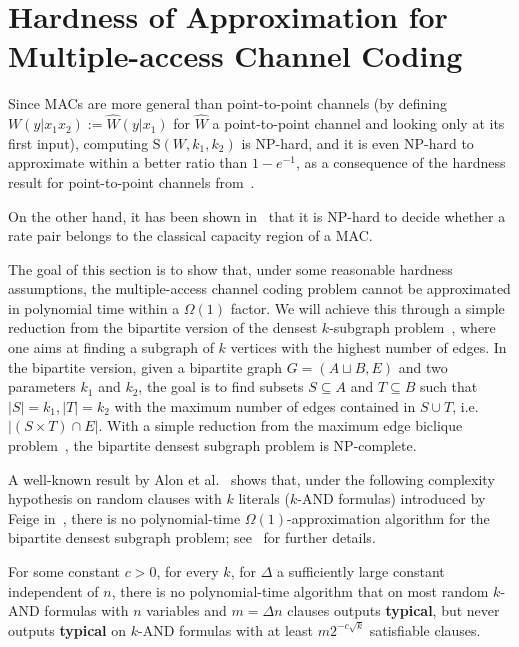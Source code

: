 \section{Hardness of Approximation for Multiple-access Channel Coding}
\label{section:hardness}
Since MACs are more general than point-to-point channels (by defining $W(y|x_1x_2):=\hat{W}(y|x_1)$ for $\hat{W}$ a point-to-point channel and looking only at its first input), computing $\mathrm{S}(W,k_1,k_2)$ is \textrm{NP}-hard, and it is even \textrm{NP}-hard to approximate within a better ratio than $1-e^{-1}$, as a consequence of the hardness result for point-to-point channels from~\cite{BF18}.

On the other hand, it has been shown in~\cite{LALS20} that it is \textrm{NP}-hard to decide whether a rate pair belongs to the classical capacity region of a MAC.

The goal of this section is to show that, under some reasonable hardness assumptions, the multiple-access channel coding problem cannot be approximated in polynomial time within a $\Omega(1)$ factor. We will achieve this through a simple reduction from the bipartite version of the densest $k$-subgraph problem~\cite{FKP01}, where one aims at finding a subgraph of $k$ vertices with the highest number of edges. In the bipartite version, given a bipartite graph $G = (A \sqcup B, E)$ and two parameters $k_1$ and $k_2$, the goal is to find subsets $S \subseteq A$ and $T \subseteq B$ such that $|S|=k_1,|T|=k_2$ with the maximum number of edges contained in $S \cup T$, i.e. $|(S \times T) \cap E|$. With a simple reduction from the maximum edge biclique problem~\cite{Peeters03}, the bipartite densest subgraph problem is \textrm{NP}-complete.

A well-known result by Alon et al.~\cite{AAMMW11} shows that, under the following complexity hypothesis on random clauses with $k$ literals ($k$-AND formulas) introduced by Feige in~\cite{Feige02}, there is no polynomial-time $\Omega(1)$-approximation algorithm for the bipartite densest subgraph problem; see~\cite{AAMMW11} for further details.

\begin{hypothesis}
\label{hypo:kANDFeige}
For some constant $c > 0$, for every $k$, for $\Delta$ a sufficiently large constant independent of $n$, there is no polynomial-time algorithm that on most random $k$-AND formulas with $n$ variables and $m = \Delta n$ clauses outputs \textbf{typical}, but never outputs \textbf{typical} on $k$-AND formulas with at least $m2^{-c\sqrt{k}}$ satisfiable clauses.
\end{hypothesis}

